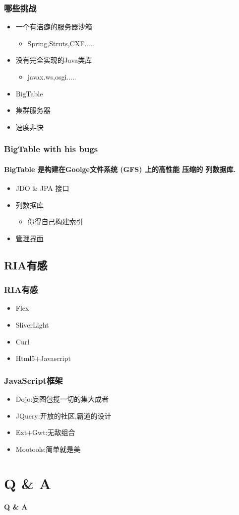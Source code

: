 \documentclass[dvipdfm,serif,mathserif]{beamer}
\begin{document}
\begin{frame}
  \frametitle{哪些挑战}
\begin{itemize}
\item 一个有洁癖的服务器沙箱
\begin{itemize}
 \item Spring,Struts,CXF.....
\end{itemize}
\item 没有完全实现的Java类库
\begin{itemize}
 \item javax.ws,osgi.....
\end{itemize}
\item BigTable
\item 集群服务器
\item 速度非快
\end{itemize}
\end{frame}

\begin{frame}
  \frametitle{BigTable with his bugs}
\framesubtitle{BigTable  是构建在Goolge文件系统 (GFS) 上的高性能 压缩的 列数据库.}
\begin{itemize}
\item JDO \& JPA 接口
\item 列数据库
\begin{itemize}
 \item 你得自己构建索引
\end{itemize}
 \item \href{http://appengine.google.com/}{\color{blue}管理界面}
\end{itemize}
\end{frame}

\subsection{RIA有感}

\begin{frame}
  \frametitle{RIA有感}
\begin{itemize}
\item Flex
\item SliverLight
\item Curl
\item Html5+Javascript
\end{itemize}
\end{frame}

\begin{frame}
  \frametitle{JavaScript框架}
\begin{itemize}
\item Dojo:妄图包揽一切的集大成者
\item JQuery:开放的社区,霸道的设计
\item Ext+Gwt:无敌组合
\item Mootools:简单就是美
\end{itemize}
\end{frame}

\section{Q \& A}
\begin{frame}
\begin{Huge}\begin{center}
            \textbf{  Q \& A}
             \end{center}\end{Huge}
\end{frame}
\end{document}
